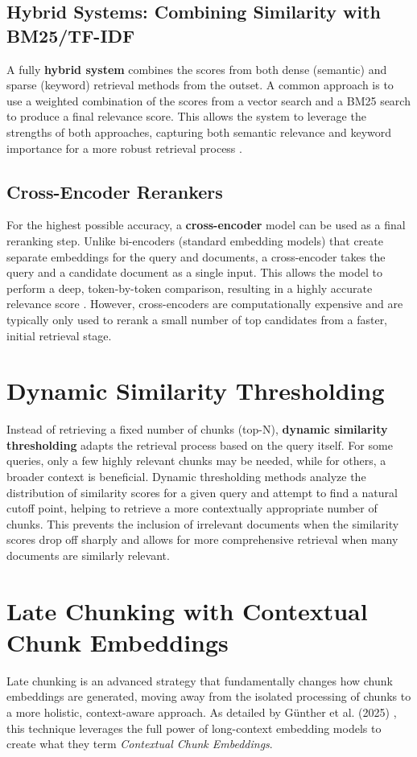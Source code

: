 \subsection{Hybrid Systems: Combining Similarity with BM25/TF-IDF}
A fully \textbf{hybrid system} combines the scores from both dense (semantic) and sparse (keyword) retrieval methods from the outset. A common approach is to use a weighted combination of the scores from a vector search and a BM25 search to produce a final relevance score. This allows the system to leverage the strengths of both approaches, capturing both semantic relevance and keyword importance for a more robust retrieval process \autocite{gao2024retrievalaugmented}.

\subsection{Cross-Encoder Rerankers}
For the highest possible accuracy, a \textbf{cross-encoder} model can be used as a final reranking step. Unlike bi-encoders (standard embedding models) that create separate embeddings for the query and documents, a cross-encoder takes the query and a candidate document as a single input. This allows the model to perform a deep, token-by-token comparison, resulting in a highly accurate relevance score \autocite{khattab2020colbert}. However, cross-encoders are computationally expensive and are typically only used to rerank a small number of top candidates from a faster, initial retrieval stage.

\section{Dynamic Similarity Thresholding}
Instead of retrieving a fixed number of chunks (top-N), \textbf{dynamic similarity thresholding} adapts the retrieval process based on the query itself. For some queries, only a few highly relevant chunks may be needed, while for others, a broader context is beneficial. Dynamic thresholding methods analyze the distribution of similarity scores for a given query and attempt to find a natural cutoff point, helping to retrieve a more contextually appropriate number of chunks. This prevents the inclusion of irrelevant documents when the similarity scores drop off sharply and allows for more comprehensive retrieval when many documents are similarly relevant.

\section{Late Chunking with Contextual Chunk Embeddings}
Late chunking is an advanced strategy that fundamentally changes how chunk embeddings are generated, moving away from the isolated processing of chunks to a more holistic, context-aware approach. As detailed by Günther et al. (2025) \autocite{günther2025latechunkingcontextualchunk}, this technique leverages the full power of long-context embedding models to create what they term \textit{Contextual Chunk Embeddings}.

